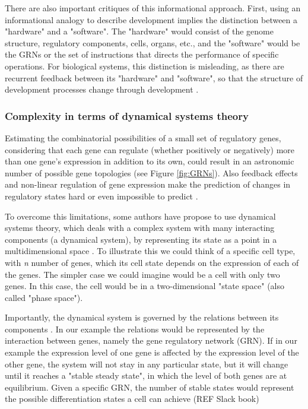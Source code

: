 There are also important critiques of this informational approach. First, using an informational analogy to describe development implies the distinction between a "hardware" and a "software".
The "hardware" would consist of the genome structure, regulatory components, cells, organs, etc., and the "software" would be the GRNs or the set of instructions that directs the performance of specific operations.
For biological systems, this distinction is misleading, as there are recurrent feedback between its "hardware" and "software", so that the structure of development processes change through development \citep{susan2000ontogeny,Salazar-Ciudad2009,Jaeger2014devmech}.


\subsubsection{Complexity in terms of dynamical systems theory}

Estimating the combinatorial possibilities of a small set of regulatory genes, considering that each gene can regulate (whether positively or negatively) more than one gene's expression in addition to its own, could result in an astronomic number of possible gene topologies (see Figure \ref{fig:GRNs}).
Also feedback effects and non-linear regulation of gene expression make the prediction of changes in regulatory states hard or even impossible to predict \citep{Jaeger2014devmech}.

To overcome this limitations, some authors have propose to use dynamical systems theory, which deals with a complex system with many interacting components (a dynamical system), by representing its state as a point in a multidimensional space \citep{Alberch1991,ForgacsandStuartA.Newman.2005,Jaeger2014devmech}. 
To illustrate this we could think of a specific cell type, with \textit{n} number of genes, which its cell state depends on the expression of each of the genes.
The simpler case we could imagine would be a cell with only two genes. In this case, the cell would be in a two-dimensional "state space" (also called "phase space").

Importantly, the dynamical system is governed by the relations between its components \citep{ForgacsandStuartA.Newman.2005}. In our example the relations would be represented by the interaction between genes, namely the gene regulatory network (GRN). 
If in our example the expression level of one gene is affected by the expression level of the other gene, the system will not stay in any particular state, but it will change until it reaches a "stable steady state", in which the level of both genes are at equilibrium. 
Given a specific GRN, the number of stable states would represent the possible differentiation states a cell can achieve (REF Slack book)

